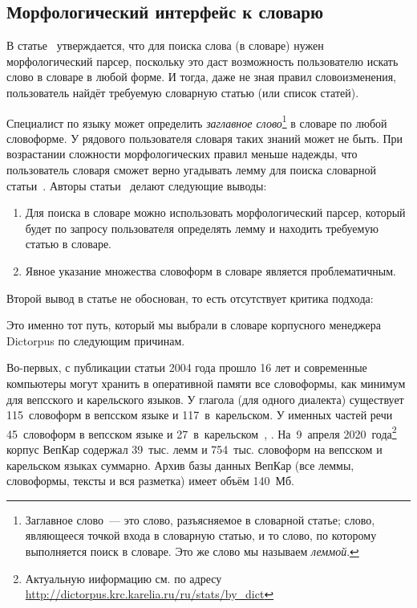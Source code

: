 
\subsection{Морфологический интерфейс к словарю} \label{sect_morpho_API_to_dict}

В статье~\cite[с.~65]{morphoAPI2dict2004Maxwell} утверждается, 
что для поиска слова (в словаре) нужен морфологический парсер, 
поскольку это даст возможность пользователю искать слово в словаре в любой форме. 
И тогда, даже не зная правил словоизменения, пользователь найдёт требуемую словарную статью (или список статей).

Специалист по языку может определить \emph{заглавное слово}\footnote{Заглавное слово~--- это слово, разъясняемое в словарной статье; слово, являющееся точкой входа в словарную статью, и то слово, по которому выполняется поиск в словаре. Это же слово мы называем \emph{леммой}.} в словаре по любой словоформе. У рядового пользователя словаря таких знаний может не быть.
При возрастании сложности морфологических правил меньше надежды, 
что пользователь словаря сможет верно угадывать лемму 
для поиска словарной статьи~\cite[с.~66]{morphoAPI2dict2004Maxwell}. 
Авторы статьи~\cite{morphoAPI2dict2004Maxwell} делают следующие выводы:
\begin{enumerate}
\item Для поиска в словаре можно использовать морфологический парсер, который будет по запросу пользователя определять лемму и находить требуемую статью в словаре.
\item Явное указание множества словоформ в словаре является проблематичным.
\end{enumerate}

\noindent
Второй вывод в статье не обоснован,
то есть отсутствует критика подхода: 


\noindent
Это именно тот путь, который мы выбрали в словаре корпусного менеджера Dictorpus 
по следующим причинам. 

Во-первых, с публикации статьи 2004 года прошло 16 лет и современные компьютеры могут хранить в оперативной памяти все словоформы, как минимум для вепсского и карельского языков. 
У глагола (для одного диалекта) существует 115~словоформ в вепсском языке и 117~в~карельском. 
У именных частей речи 45~словоформ в вепсском языке и 
27~в~карельском~\cite[с.~415--428]{ZaitsevaNG2012OrphDict}, 
\cite{Novak2019Grammar, 
        Zaikov2000KarGram, 
        ZaitsevaMI1981, 
        ZaitsevaNG1981VepsName, 
        ZaitsevaNG2002VepsVerb}. 
На~9~апреля 2020~года\footnote{Актуальную ииформацию см. по адресу \url{http://dictorpus.krc.karelia.ru/ru/stats/by_dict}} корпус ВепКар содержал 39~тыс. лемм и 754~тыс. словоформ на вепсском и карельском языках суммарно. 
Архив базы данных ВепКар (все леммы, словоформы, тексты и вся разметка) имеет объём 140~Мб.


